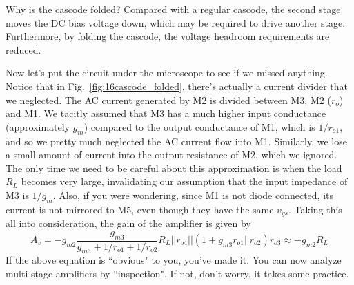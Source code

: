Why is the cascode folded?  Compared with a regular cascode, the second stage moves the DC bias voltage down, which may be required to drive another stage.  Furthermore, by folding the cascode, the voltage headroom requirements are reduced.

Now let's put the circuit under the microscope to see if we missed anything.  Notice that in Fig.~\ref{fig:16cascode_folded}, there's actually a current divider that we neglected.  The AC current generated by M2 is divided between M3, M2 ($r_o$) and M1.  We tacitly assumed that M3 has a much higher input conductance (approximately $g_m$) compared to the output conductance of M1, which is $1/r_{o1}$, and so we pretty much neglected the AC current flow into M1.  Similarly, we lose a small amount of current into the output resistance of M2, which we ignored.  The only time we need to be careful about this approximation is when the load $R_L$ becomes very large, invalidating our assumption that the input impedance of M3 is $1/g_m$.  Also, if you were wondering, since M1 is not diode connected, its current is not mirrored to M5, even though they have the same $v_{gs}$.  Taking this all into consideration, the gain of the amplifier is given by
\begin{equation}
	A_v = - g_{m2} \frac{g_{m3}}{g_{m3} + 1/r_{o1} + 1/r_{o2}} R_L || r_{o4} || (1 + g_{m3} r_{o1}||r_{o2} ) r_{o3}  \approx -g_{m2} R_L
\end{equation} 
If the above equation is ``obvious" to you, you've made it.  You can now analyze multi-stage amplifiers by ``inspection".  If not, don't worry, it takes some practice.
%
%
%
%
% 
%
%
%
